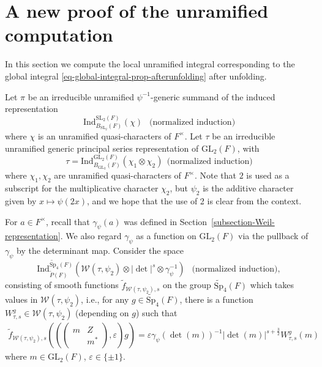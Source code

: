 \documentclass[11pt]{amsart}
\theoremstyle{definition}
\theoremstyle{remark}
\newcommand{\GL}{\mathrm{GL}}
\begin{document}
\section{A new proof of the unramified computation}
\label{section-unramified}

In this section we compute the local unramified integral  corresponding to the global integral \eqref{eq-global-integral-prop-afterunfolding} after unfolding.  

Let $\pi$ be an irreducible unramified $\psi^{-1}$-generic summand of the induced representation
$$
\mathrm{Ind}_{B_{\mathrm{SL}_2}(F)}^{\mathrm{SL}_2(F)}(\chi) \ \ \text{ (normalized induction)}
$$
where $\chi$ is an unramified quasi-characters of $F^\times$. Let $\tau$ be an irreducible unramified generic principal series representation of $\mathrm{GL}_2(F)$, with 
$$\tau=\mathrm{Ind}_{B_{\mathrm{GL}_2}(F)}^{\mathrm{GL}_2(F)}(\chi_1 \otimes \chi_2) \ \   \text{(normalized induction)}
$$ 
where $\chi_1, \chi_2$ are unramified quasi-characters of $F^\times$. Note that $2$ is used as a subscript for the multiplicative character $\chi_2$, but $\psi_2$ is the additive character given by $x\mapsto \psi(2x)$, and we hope that the use of 2 is clear from the context.

For $a\in F^\times$, recall that $\gamma_\psi(a)$ was defined in Section~\ref{subsection-Weil-representation}. We also regard $\gamma_\psi$ as a function on $\GL_2(F)$ via the pullback of $\gamma_\psi$ by the determinant map.
Consider the space
$$
  \mathrm{Ind}_{\widetilde{P}(F)}^{\widetilde{\mathrm{Sp}}_4(F)}(\mathcal{W}(\tau, \psi_2) \otimes   |\det|^s \otimes \gamma_\psi^{-1} ) \ \ \text{ (normalized induction)},
$$
consisting of smooth functions $\tilde{f}_{\mathcal{W}(\tau,\psi_2), s} $ on the group $\widetilde{\mathrm{Sp}}_4(F)$ which takes values in $\mathcal{W}(\tau, \psi_2)$, i.e., for any $g\in \widetilde{\mathrm{Sp}}_4(F)$, there is a function $W^g_{\tau, s}\in \mathcal{W}(\tau, \psi_2)$ (depending on $g$) such that 
\begin{equation}
\begin{split}
\tilde{f}_{\mathcal{W}(\tau,\psi_2), s}  \left(   \left( \left(\begin{smallmatrix} m & Z\\ & m^* \end{smallmatrix}\right) , \varepsilon\right)  g   \right) = \varepsilon \gamma_{\psi}(\det(m))^{-1} |\det(m)|^{s+\frac{3}{2}} W_{\tau, s}^g(m)
\end{split}
\label{eq-local-induction-space1}
\end{equation}
where $m\in \mathrm{GL}_2(F)$, $\varepsilon\in \{\pm 1\}$. 
\end{document}
